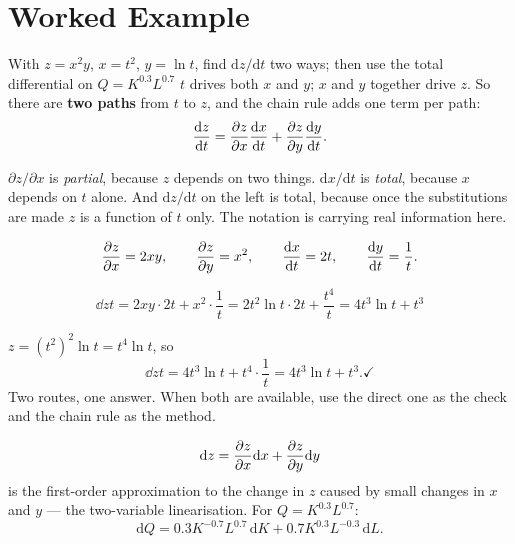 \section{Worked Example}

\begin{worked}{With $z=x^{2}y$, $x=t^{2}$, $y=\ln t$, find $\mathrm{d}z/\mathrm{d}t$ two ways; then use the total differential on $Q=K^{0.3}L^{0.7}$}
$t$ drives both $x$ and $y$; $x$ and $y$ together drive $z$. So there are
\textbf{two paths} from $t$ to $z$, and the chain rule adds one term per
path:
\[
  \frac{\mathrm{d}z}{\mathrm{d}t}=\frac{\partial z}{\partial x}\frac{\mathrm{d}x}{\mathrm{d}t}+\frac{\partial z}{\partial y}\frac{\mathrm{d}y}{\mathrm{d}t} .
\]

$\partial z/\partial x$ is \emph{partial}, because $z$ depends on two
things. $\mathrm{d}x/\mathrm{d}t$ is \emph{total}, because $x$ depends on
$t$ alone. And $\mathrm{d}z/\mathrm{d}t$ on the left is total, because once
the substitutions are made $z$ is a function of $t$ only. The notation is
carrying real information here.

\[
  \frac{\partial z}{\partial x}=2xy,\qquad
  \frac{\partial z}{\partial y}=x^{2},\qquad
  \frac{\mathrm{d}x}{\mathrm{d}t}=2t,\qquad
  \frac{\mathrm{d}y}{\mathrm{d}t}=\frac1t .
\]

\[
  \dd{z}{t}=2xy\cdot2t+x^{2}\cdot\frac1t
  =2t^{2}\ln t\cdot2t+\frac{t^{4}}{t}
  =\boxed{4t^{3}\ln t+t^{3}}
\]

$z=(t^{2})^{2}\ln t=t^{4}\ln t$, so
\[
  \dd{z}{t}=4t^{3}\ln t+t^{4}\cdot\frac1t=4t^{3}\ln t+t^{3} . \checkmark
\]
Two routes, one answer. When both are available, use the direct one as the
check and the chain rule as the method.

\[
  \mathrm{d}z=\frac{\partial z}{\partial x}\mathrm{d}x+\frac{\partial z}{\partial y}\mathrm{d}y
\]
is the first-order approximation to the change in $z$ caused by small
changes in $x$ and $y$ --- the two-variable linearisation. For
$Q=K^{0.3}L^{0.7}$:
\[
  \mathrm{d}Q=0.3K^{-0.7}L^{0.7}\,\mathrm{d}K+0.7K^{0.3}L^{-0.3}\,\mathrm{d}L .
\]


\end{worked}
